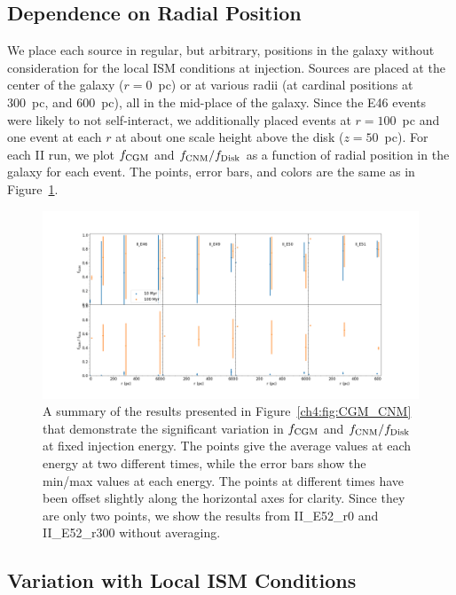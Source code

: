 \subsection{Dependence on Radial Position}
\label{ch4:sec:radial position}
We place each source in regular, but arbitrary, positions in the galaxy without consideration for the local ISM conditions at injection. Sources are placed at the center of the galaxy ($r = 0$~pc) or at various radii (at cardinal positions at 300~pc, and 600~pc), all in the mid-place of the galaxy. Since the E46 events were likely to not self-interact, we additionally placed events at $r = 100$~pc and one event at each $r$ at about one scale height above the disk ($z = 50$~pc). For each II run, we plot $f_{\rm CGM}$ and $f_{\rm CNM} / f_{\rm Disk}$ as a function of radial position in the galaxy for each event. The points, error bars, and colors are the same as in Figure~\ref{ch4:fig:CGM_CNM_variance}.

 \begin{figure}
   \centering
   \includegraphics[width=0.95\linewidth]{figures/ch4/II_radial_dependence}
   \caption{A summary of the results presented in Figure~\ref{ch4:fig:CGM_CNM} that demonstrate the significant variation in $f_{\rm CGM}$ and
   $f_{\rm CNM} / f_{\rm Disk}$ at fixed injection energy. The points give the average values at each energy at two different times, while the
   error bars show the min/max values at each energy. The points at different times have been offset slightly along the horizontal axes for clarity. Since they are only two points, we show the results from II_E52_r0 and II_E52_r300 without averaging.}
   \label{ch4:fig:CGM_CNM_variance}
 \end{figure}

\subsection{Variation with Local ISM Conditions}
\label{ch4:sec:ISM density}

